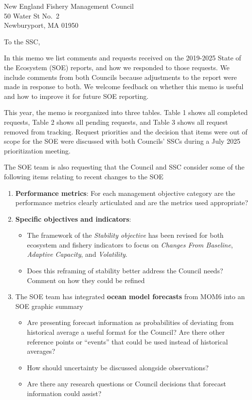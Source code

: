 \documentclass[10pt,]{letter}
\date{25 June, 2026}
\providecommand{\tightlist}{%
  \setlength{\itemsep}{0pt}\setlength{\parskip}{0pt}}
\begin{document}
\begin{letter}{New England Fishery Management Council\\50 Water St
No.~2\\Newburyport, MA 01950}
\opening{To the SSC,}

In this memo we list comments and requests received on the 2019-2025
State of the Ecosystem (SOE) reports, and how we responded to those
requests. We include comments from both Councils because adjustments to
the report were made in response to both. We welcome feedback on whether
this memo is useful and how to improve it for future SOE reporting.

This year, the memo is reorganized into three tables. Table 1 shows all
completed requests, Table 2 shows all pending requests, and Table 3
shows all request removed from tracking. Request priorities and the
decision that items were out of scope for the SOE were discussed with
both Councils' SSCs during a July 2025 prioritization meeting.

The SOE team is also requesting that the Council and SSC consider some
of the following items relating to recent changes to the SOE

\begin{enumerate}
\def\labelenumi{\arabic{enumi}.}
\item
  \textbf{Performance metrics}: For each management objective category
  are the performance metrics clearly articulated and are the metrics
  used appropriate?
\item
  \textbf{Specific objectives and indicators}:

  \begin{itemize}
  \tightlist
  \item
    The framework of the \emph{Stability objective} has been revised for
    both ecosystem and fishery indicators to focus on \emph{Changes From
    Baseline}, \emph{Adaptive Capacity}, and \emph{Volatility}.
  \item
    Does this reframing of stability better address the Council needs?
    Comment on how they could be refined
  \end{itemize}
\item
  The SOE team has integrated \textbf{ocean model forecasts} from MOM6
  into an SOE graphic summary

  \begin{itemize}
  \tightlist
  \item
    Are presenting forecast information as probabilities of deviating
    from historical average a useful format for the Council? Are there
    other reference points or ``events'' that could be used instead of
    historical averages?
  \item
    How should uncertainty be discussed alongside observations?
  \item
    Are there any research questions or Council decisions that forecast
    information could assist?
  \end{itemize}
\end{enumerate}


\end{letter}
\end{document}
